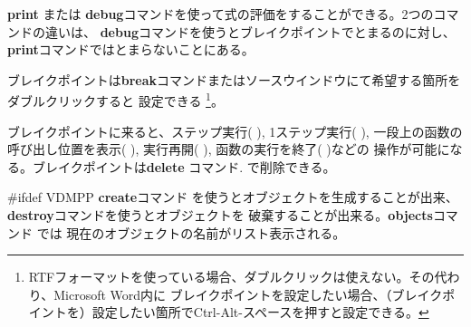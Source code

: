 \documentclass[\pformat,12pt]{article}
\newcommand{\guicmd}[1]{{\sf #1}}
\newcommand{\guicmd}[1]{{\gt #1}}
\begin{document}
\textbf{print} または
\textbf{debug}コマンドを使って式の評価をすることができる。2つのコマンドの違いは、
{\bf debug}コマンドを使うとブレイクポイントでとまるのに対し、{\bf print}コマンドではとまらないことにある。

ブレイクポイントは\textbf{break}コマンドまたは\guicmd{ソース}ウインドウにて希望する箇所をダブルクリックすると
設定できる \footnote{RTFフォーマットを使っている場合、ダブルクリックは使えない。その代わり、Microsoft Word内に
ブレイクポイントを設定したい場合、（ブレイクポイントを）設定したい箇所でCtrl-Alt-スペースを押すと設定できる。}。

ブレイクポイントに来ると、\guicmd{ステップ実行}(\hspace{-1.8mm}
),
\guicmd{1ステップ実行}(\hspace{-1.8mm} 
),
\guicmd{一段上の函数の呼び出し位置を表示}(\hspace{-1.8mm}
),
\guicmd{実行再開}(\hspace{-1.8mm}
),
\guicmd{函数の実行を終了}(\hspace{-1.8mm} 
)などの
操作が可能になる。ブレイクポイントは\textbf{delete} コマンド.
で削除できる。

#ifdef VDMPP
\textbf{create}コマンド を使うとオブジェクトを生成することが出来、
\textbf{destroy}コマンドを使うとオブジェクトを
破棄することが出来る。\textbf{objects}コマンド では
現在のオブジェクトの名前がリスト表示される。
\end{document}
